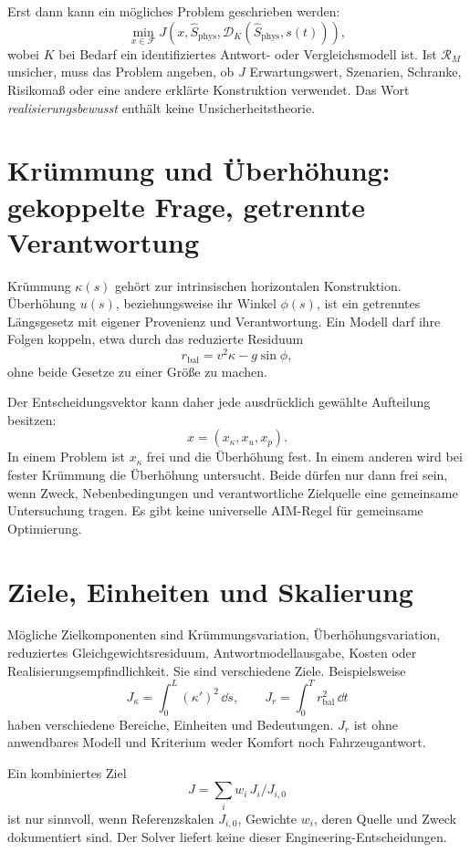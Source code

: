 Erst dann kann ein mögliches Problem geschrieben werden:
\[
\min_{x\in\mathcal F}
J\!\left(
x,\widehat S_{\mathrm{phys}},
\mathcal D_K(\widehat S_{\mathrm{phys}},s(t))
\right),
\]
wobei \(K\) bei Bedarf ein identifiziertes Antwort- oder Vergleichsmodell ist.
Ist \(\mathcal R_M\) unsicher, muss das Problem angeben, ob \(J\) Erwartungswert,
Szenarien, Schranke, Risikomaß oder eine andere erklärte Konstruktion
verwendet. Das Wort \emph{realisierungsbewusst} enthält keine
Unsicherheitstheorie.

\section{Krümmung und Überhöhung: gekoppelte Frage, getrennte Verantwortung}

Krümmung \(\kappa(s)\) gehört zur intrinsischen horizontalen Konstruktion.
Überhöhung \(u(s)\), beziehungsweise ihr Winkel \(\phi(s)\), ist ein getrenntes
Längsgesetz mit eigener Provenienz und Verantwortung. Ein Modell darf ihre
Folgen koppeln, etwa durch das reduzierte Residuum
\[
r_{\mathrm{bal}}=v^2\kappa-g\sin\phi,
\]
ohne beide Gesetze zu einer Größe zu machen.

Der Entscheidungsvektor kann daher jede ausdrücklich gewählte Aufteilung
besitzen:
\[
x=(x_\kappa,x_u,x_p).
\]
In einem Problem ist \(x_\kappa\) frei und die Überhöhung fest. In einem
anderen wird bei fester Krümmung die Überhöhung untersucht. Beide dürfen nur
dann frei sein, wenn Zweck, Nebenbedingungen und verantwortliche Zielquelle
eine gemeinsame Untersuchung tragen. Es gibt keine universelle AIM-Regel für
gemeinsame Optimierung.

\section{Ziele, Einheiten und Skalierung}

Mögliche Zielkomponenten sind Krümmungsvariation, Überhöhungsvariation,
reduziertes Gleichgewichtsresiduum, Antwortmodellausgabe, Kosten oder
Realisierungsempfindlichkeit. Sie sind verschiedene Ziele. Beispielsweise
\[
J_\kappa=\int_0^L(\kappa')^2\,\dd s,
\qquad
J_r=\int_0^T r_{\mathrm{bal}}^2\,\dd t
\]
haben verschiedene Bereiche, Einheiten und Bedeutungen. \(J_r\) ist ohne
anwendbares Modell und Kriterium weder Komfort noch Fahrzeugantwort.

Ein kombiniertes Ziel
\[
J=\sum_i w_i\,J_i/J_{i,0}
\]
ist nur sinnvoll, wenn Referenzskalen \(J_{i,0}\), Gewichte \(w_i\), deren
Quelle und Zweck dokumentiert sind. Der Solver liefert keine dieser
Engineering-Entscheidungen.

